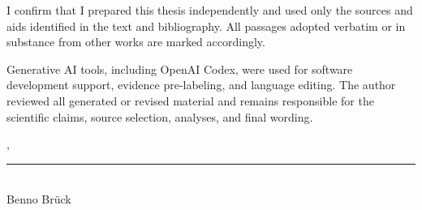 \thispagestyle{empty}

I confirm that I prepared this thesis independently and used only the sources
and aids identified in the text and bibliography. All passages adopted
verbatim or in substance from other works are marked accordingly.

Generative AI tools, including OpenAI Codex, were used for software
development support, evidence pre-labeling, and language editing. The author
reviewed all generated or revised material and remains responsible for the
scientific claims, source selection, analyses, and final wording.

\vspace{20mm}

\noindent\getSubmissionLocation{}, \getSubmissionDate{}

\vspace{15mm}

\noindent\rule{65mm}{0.4pt}\\
Benno Brück
